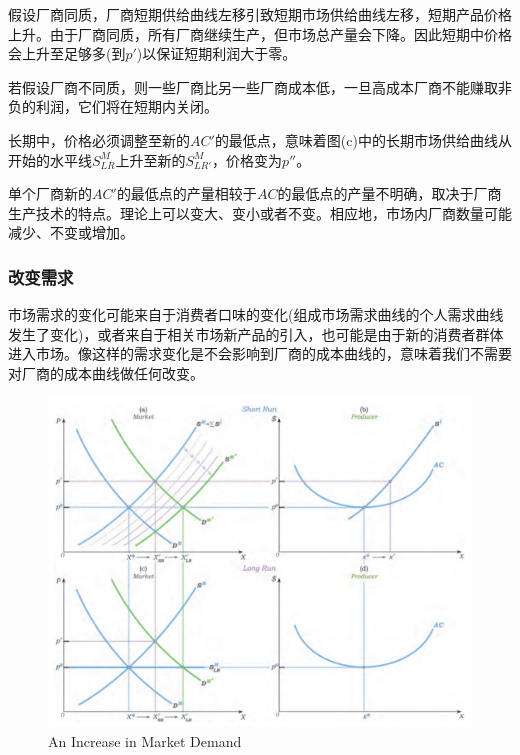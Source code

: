 \documentclass{article}
\begin{document}
假设厂商同质，厂商短期供给曲线左移引致短期市场供给曲线左移，短期产品价格上升。由于厂商同质，所有厂商继续生产，但市场总产量会下降。因此短期中价格会上升至足够多(到$ p' $)以保证短期利润大于零。

若假设厂商不同质，则一些厂商比另一些厂商成本低，一旦高成本厂商不能赚取非负的利润，它们将在短期内关闭。

长期中，价格必须调整至新的$ AC' $的最低点，意味着图(c)中的长期市场供给曲线从开始的水平线$ S^M_{LR} $上升至新的$ S^M_{LR'} $，价格变为$ p'' $。

单个厂商新的$ AC' $的最低点的产量相较于$ AC $的最低点的产量不明确，取决于厂商生产技术的特点。理论上可以变大、变小或者不变。相应地，市场内厂商数量可能减少、不变或增加。

\subsubsection{改变需求}

市场需求的变化可能来自于消费者口味的变化(组成市场需求曲线的个人需求曲线发生了变化)，或者来自于相关市场新产品的引入，也可能是由于新的消费者群体进入市场。像这样的需求变化是不会影响到厂商的成本曲线的，意味着我们不需要对厂商的成本曲线做任何改变。

\begin{figure}[H] %
	\centering %
	\includegraphics[width=1\textwidth]{14_6} %
	\caption{An Increase in Market Demand} %
	\label{Fig.main7} %
\end{figure}
\end{document}
